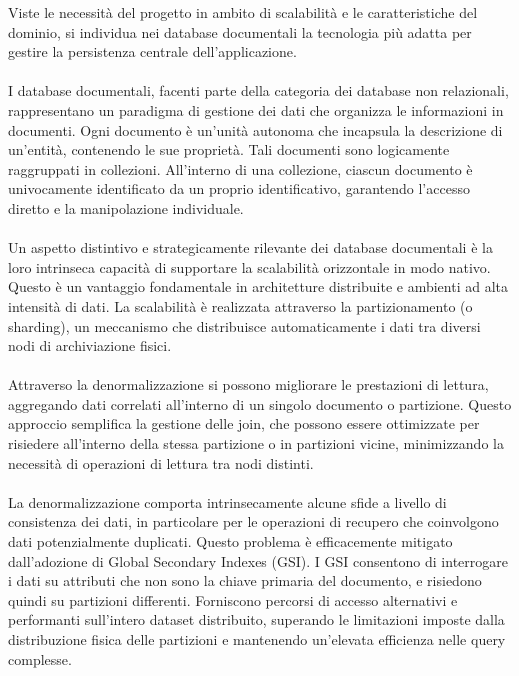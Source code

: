 Viste le necessità del progetto in ambito di scalabilità
e le caratteristiche del dominio,
si individua nei database documentali la tecnologia più adatta
per gestire la persistenza centrale dell'applicazione.\\
\\
I database documentali, facenti parte della categoria dei database non relazionali,
rappresentano un paradigma di gestione dei dati
che organizza le informazioni in documenti.
Ogni documento è un'unità autonoma che incapsula la descrizione di un'entità,
contenendo le sue proprietà.
Tali documenti sono logicamente raggruppati in collezioni.
All'interno di una collezione,
ciascun documento è univocamente identificato da un proprio identificativo,
garantendo l'accesso diretto e la manipolazione individuale.\\
\\
Un aspetto distintivo e strategicamente rilevante dei database documentali è
la loro intrinseca capacità di supportare la scalabilità orizzontale in modo nativo.
Questo è un vantaggio fondamentale in architetture distribuite e ambienti ad alta intensità di dati.
La scalabilità è realizzata attraverso la partizionamento (o sharding),
un meccanismo che distribuisce automaticamente i dati tra diversi nodi di archiviazione fisici.\\
\\
Attraverso la denormalizzazione si possono migliorare le prestazioni di lettura,
aggregando dati correlati all'interno di un singolo documento o partizione.
Questo approccio semplifica la gestione delle join,
che possono essere ottimizzate per risiedere all'interno della stessa partizione o
in partizioni vicine, minimizzando la necessità di operazioni di lettura tra nodi distinti.\\
\\
La denormalizzazione comporta intrinsecamente
alcune sfide a livello di consistenza dei dati,
in particolare per le operazioni di recupero che coinvolgono dati potenzialmente duplicati.
Questo problema è efficacemente mitigato dall'adozione di Global Secondary Indexes (GSI).
I GSI consentono di interrogare i dati su attributi che non sono la chiave primaria del documento,
e risiedono quindi su partizioni differenti.
Forniscono percorsi di accesso alternativi e performanti sull'intero dataset distribuito,
superando le limitazioni imposte dalla distribuzione fisica delle partizioni e
mantenendo un'elevata efficienza nelle query complesse.\\
\\
